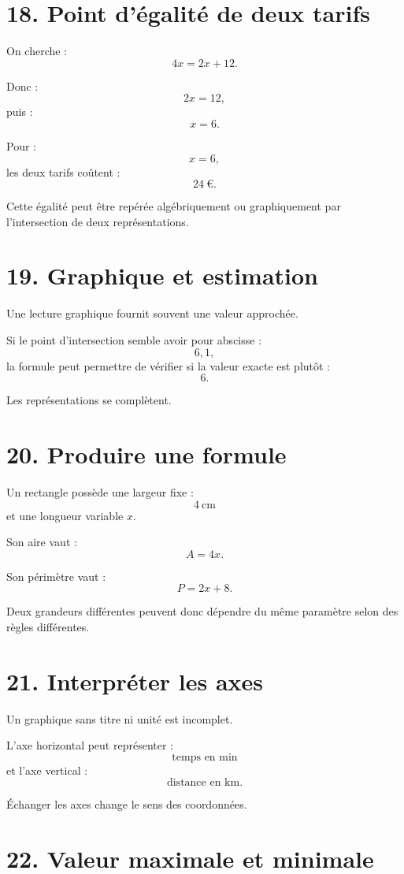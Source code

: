 \section{18. Point d'égalité de deux tarifs}

On cherche :
\[
4x=2x+12.
\]

Donc :
\[
2x=12,
\]
puis :
\[
x=6.
\]

Pour :
\[
x=6,
\]
les deux tarifs coûtent :
\[
24\ \text{€}.
\]

Cette égalité peut être repérée algébriquement ou graphiquement par l'intersection de deux représentations.

\section{19. Graphique et estimation}

Une lecture graphique fournit souvent une valeur approchée.

Si le point d'intersection semble avoir pour abscisse :
\[
6{,}1,
\]
la formule peut permettre de vérifier si la valeur exacte est plutôt :
\[
6.
\]

Les représentations se complètent.

\section{20. Produire une formule}

Un rectangle possède une largeur fixe :
\[
4\ \text{cm}
\]
et une longueur variable $x$.

Son aire vaut :
\[
A=4x.
\]

Son périmètre vaut :
\[
P=2x+8.
\]

Deux grandeurs différentes peuvent donc dépendre du même paramètre selon des règles différentes.

\section{21. Interpréter les axes}

Un graphique sans titre ni unité est incomplet.

L'axe horizontal peut représenter :
\[
\text{temps en min}
\]
et l'axe vertical :
\[
\text{distance en km}.
\]

Échanger les axes change le sens des coordonnées.

\section{22. Valeur maximale et minimale}

